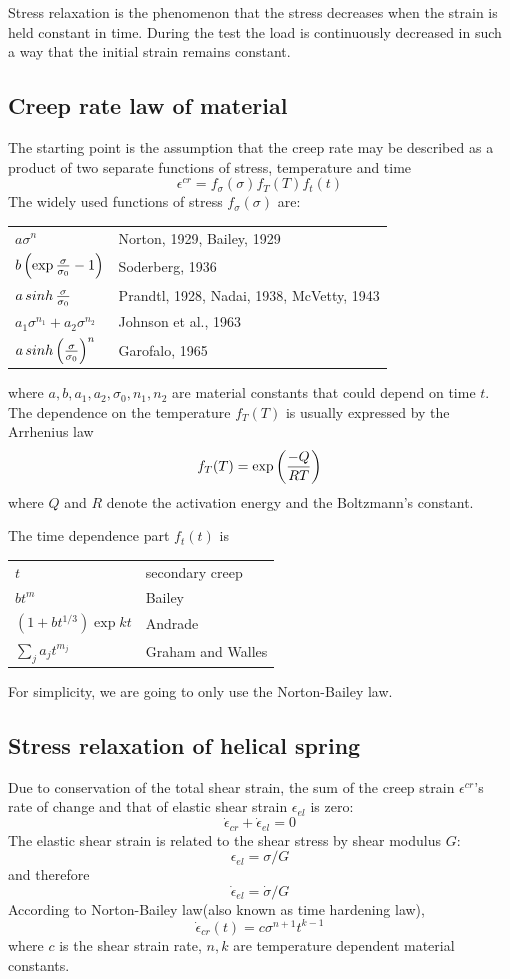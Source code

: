 \documentclass[10pt]{article}
\begin{document}
Stress relaxation is the phenomenon that the stress decreases when the strain is held constant in time. During the test the load is continuously decreased in such a way that the initial strain remains constant.

\subsection{Creep rate law of material}
The starting point is the assumption that the creep rate may be described as a product of two separate functions of stress, temperature and time
\[
\epsilon^{cr}=f_\sigma (\sigma) f_T(T) f_t(t)
\]
The widely used functions of stress $f_\sigma(\sigma)$ are:

\begin{tabular}{ll}
$a\sigma^n$ & Norton, 1929, Bailey, 1929 \\
$b\left( \exp{\sigma\over \sigma_0} -1 \right)$ & Soderberg, 1936 \\
$a\mathop{sinh}{\sigma\over \sigma_0}$ & Prandtl, 1928, Nadai, 1938, McVetty, 1943\\
$a_1\sigma^{n_1} + a_2 \sigma^{n_2}$ & Johnson et al., 1963 \\
$a\mathop{sinh} \left( {\sigma\over \sigma_0}\right)^n$ & Garofalo, 1965
\end{tabular}

where $a,b,a_1,a_2,\sigma_0,n_1,n_2$ are material constants that could depend on time $t$. The dependence on the temperature $f_T(T)$ is usually expressed by the Arrhenius law
\[
f_T(T) = \exp \left( {-Q\over RT}\right)
\]
where $Q$ and $R$ denote the activation energy and the Boltzmann's constant.

The time dependence part $f_t(t)$ is

\begin{tabular}{ll}
$t$ & secondary creep \\
$bt^m$ & Bailey \\
$(1+bt^{1/3})\exp{kt}$ & Andrade\\
$\sum_j a_j t^{m_j}$ & Graham and Walles
\end{tabular}

For simplicity, we are going to only use the Norton-Bailey law.
\subsection{Stress relaxation of helical spring}
Due to conservation of the total shear strain, the sum of the creep strain $\epsilon^{cr}$'s rate of change and that of elastic shear strain $\epsilon_{el}$ is zero:
\[
\dot{\epsilon}_{cr} + \dot{\epsilon}_{el} = 0
\]
The elastic shear strain is related to the shear stress by shear modulus $G$:
\[
\epsilon_{el} = \sigma/G
\]
and therefore
\[
\dot{\epsilon}_{el} = \dot{\sigma}/G
\]
According to Norton-Bailey law(also known as time hardening law),
\begin{equation} \label{eq:N-B}
\dot{\epsilon}_{cr}(t)=c\sigma^{n+1} t^{k-1}
\end{equation}
where $c$ is the shear strain rate, $n,k$ are temperature dependent material constants.
\end{document}
